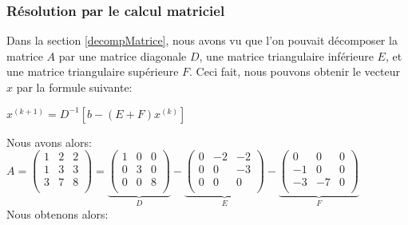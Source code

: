 \documentclass{report}
\begin{document}
\subsubsection{Résolution par le calcul matriciel}
Dans la section \ref{decompMatrice}, nous avons vu que l'on pouvait décomposer la matrice $A$ par une matrice diagonale $D$, une matrice triangulaire inférieure $E$, et une matrice triangulaire supérieure $F$. Ceci fait, nous pouvons obtenir le vecteur $x$ par la formule suivante: \\
\begin{center}
  $x^{(k+1)}=D^{-1}[b-(E+F)x^{(k)}]$\\
\end{center}
Nous avons alors:\vspace{8pt}\\
$A=
\begin{pmatrix}
  1&2&2\\
  1&3&3\\
  3&7&8\\
\end{pmatrix}=
\underbrace{\begin{pmatrix}
  1&0&0\\
  0&3&0\\
  0&0&8\\
\end{pmatrix}}_{D}-
\underbrace{\begin{pmatrix}
  0&-2&-2\\
  0&0&-3\\
  0&0&0\\
\end{pmatrix}}_{E}-
\underbrace{\begin{pmatrix}
  0&0&0\\
  -1&0&0\\
  -3&-7&0\\
\end{pmatrix}}_{F}
$\vspace{8pt}\\
Nous obtenons alors:\vspace{8pt}\\
\end{document}
